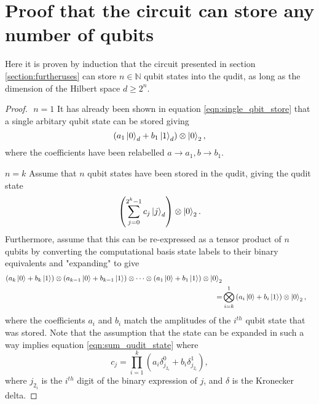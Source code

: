 \appendix
\appendixpage
\addappheadtotoc
\setcounter{equation}{0}
\renewcommand{\theequation}{A.\arabic{equation}}
\section{Proof that the circuit can store any number of qubits}
Here it is proven by induction that the circuit presented in section \ref{section:furtheruses} can store $n\in\mathbb{N}$ qubit states into the qudit, as long as the dimension of the Hilbert space $d\geq 2^n$.
\begin{proof}$ $\newline
    $n=1$\newline
    It has already been shown in equation \ref{eqn:single_qbit_store} that a single arbitary qubit state can be stored giving
    \begin{equation}
        (a_1\ket{0}_d + b_1\ket{1}_d)\otimes\ket{0}_2,
    \end{equation}
    where the coefficients have been relabelled $a \rightarrow a_1, b\rightarrow b_1$.
    \newline

    $n = k$\newline
    Assume that $n$ qubit states have been stored in the qudit, giving the qudit state
    \begin{equation}
        \left(\sum_{j=0}^{2^k - 1}c_j\ket{j}_d\right)\otimes\ket{0}_2.
        \label{eqn:sum_qudit_state}
    \end{equation}
    Furthermore, assume that this can be re-expressed as a tensor product of $n$ qubits by converting the computational basis state labels to their binary equivalents and "expanding" to give
    \begin{align}
        (a_k\ket{0} + b_k\ket{1})\otimes(a_{k-1}\ket{0} + b_{k-1}\ket{1})\otimes\cdots\otimes(a_1\ket{0} + b_1\ket{1})\otimes\ket{0}_2\\
        =&\bigotimes_{i = k}^{1}\left(a_i\ket{0} + b_i\ket{1}\right)\otimes\ket{0}_2,
    \end{align}
    where the coefficients $a_{i}$ and $b_{i}$ match the amplitudes of the $i^{th}$ qubit state that was stored.
    Note that the assumption that the state can be expanded in such a way implies equation \ref{eqn:sum_qudit_state} where
    \begin{equation}
        c_j = \prod_{i=1}^{k}(a_i \delta^{0}_{j_{2_i}} + b_i\delta^{1}_{j_{2_i}}),
    \end{equation}
    where $j_{2_i}$ is the $i^{th}$ digit of the binary expression of $j$, and $\delta$ is the Kronecker delta.\newline


\end{proof}
